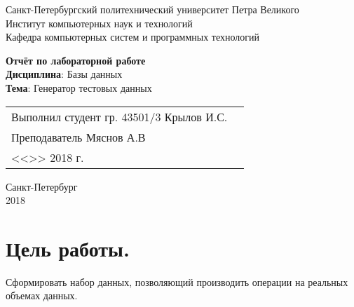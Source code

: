 \documentclass[a4paper,14pt]{extarticle}
\begin{document}
\begin{titlepage}
\centering
Санкт-Петербургский политехнический университет Петра Великого \\
Институт компьютерных наук и технологий \\
Кафедра компьютерных систем и программных технологий \\
\vspace{5.5cm}

{\centering \textbf{Отчёт по лабораторной работе} \\ 
\vspace{0.15cm}
\textbf{Дисциплина}: Базы данных \\
\vspace{0.15cm}
\textbf{Тема}: Генератор тестовых данных} \\

\vspace{5.5cm}

\begin{table}[H]
\begin{tabular}{p{\textwidth}@{}r}
{Выполнил студент гр. 43501/3} \hfill 
\vspace{0.2cm}
Крылов И.С. \\ \hfill
\vspace{0.2cm}

Преподаватель \hfill 
\vspace{0.2cm}
Мяснов А.В \\ \hfill 
\vspace{0.2cm}

{} \hfill { <<\underline{\hspace{0.08\textwidth}}>> \underline{\hspace{0.2\textwidth}}2018 г.} \\
\end{tabular}
\end{table}
\vfill
{\centering Санкт-Петербург \\ 
\vspace{0.15cm}
2018}
\end{titlepage}

\section{Цель работы.}
Сформировать набор данных, позволяющий производить операции на реальных объемах данных.
\end{document}
